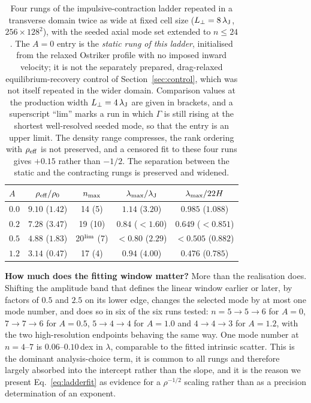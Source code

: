 \documentclass[usenatbib,twoside,twocolumn]{mnras}
\begin{document}
\begin{table}
\caption{Four rungs of the impulsive-contraction ladder repeated in a transverse domain twice as wide at fixed cell size ($L_\perp=8\,\lambda_{\rm J}$, $256\times128^2$), with the seeded axial mode set extended to $n\leq24$. The $A=0$ entry is the \emph{static rung of this ladder}, initialised from the relaxed Ostriker profile with no imposed inward velocity; it is not the separately prepared, drag-relaxed equilibrium-recovery control of Section~\ref{sec:control}, which was not itself repeated in the wider domain. Comparison values at the production width $L_\perp=4\,\lambda_{\rm J}$ are given in brackets, and a superscript ``lim'' marks a run in which $\Gamma$ is still rising at the shortest well-resolved seeded mode, so that the entry is an upper limit. The density range compresses, the rank ordering with $\rho_{\rm eff}$ is not preserved, and a censored fit to these four runs gives $+0.15$ rather than $-1/2$. The separation between the static and the contracting rungs is preserved and widened.}
\label{tab:bigbox}
\footnotesize
\setlength{\tabcolsep}{2.5pt}
\begin{tabular}{@{}lcccc@{}}
\toprule
$A$ & $\rho_{\rm eff}/\rho_0$ & $n_{\rm max}$ & $\lambda_{\rm max}/\lambda_{\rm J}$ & $\lambda_{\rm max}/22H$ \\
\midrule
$0.0$ & $9.10$ ($1.42$) & 14 (5)  & $1.14$ ($3.20$) & $0.985$ ($1.088$) \\
$0.2$ & $7.28$ ($3.47$) & 19 (10) & $0.84$ ($<1.60$) & $0.649$ ($<0.851$) \\
$0.5$ & $4.88$ ($1.83$) & 20$^{\rm lim}$ (7) & $<0.80$ ($2.29$) & $<0.505$ ($0.882$) \\
$1.2$ & $3.14$ ($0.47$) & 17 (4)  & $0.94$ ($4.00$) & $0.476$ ($0.785$) \\
\bottomrule
\end{tabular}
\end{table}

\smallskip\noindent\textbf{How much does the fitting window matter?} More than the realisation does. Shifting the amplitude band that defines the linear window earlier or later, by factors of $0.5$ and $2.5$ on its lower edge, changes the selected mode by at most one mode number, and does so in six of the six runs tested: $n=5\to5\to6$ for $A=0$, $7\to7\to6$ for $A=0.5$, $5\to4\to4$ for $A=1.0$ and $4\to4\to3$ for $A=1.2$, with the two high-resolution endpoints behaving the same way. One mode number at $n=4$--$7$ is $0.06$--$0.10$\,dex in $\lambda$, comparable to the fitted intrinsic scatter. This is the dominant analysis-choice term, it is common to all rungs and therefore largely absorbed into the intercept rather than the slope, and it is the reason we present Eq.~\ref{eq:ladderfit} as evidence for a $\rho^{-1/2}$ scaling rather than as a precision determination of an exponent.
\end{document}
